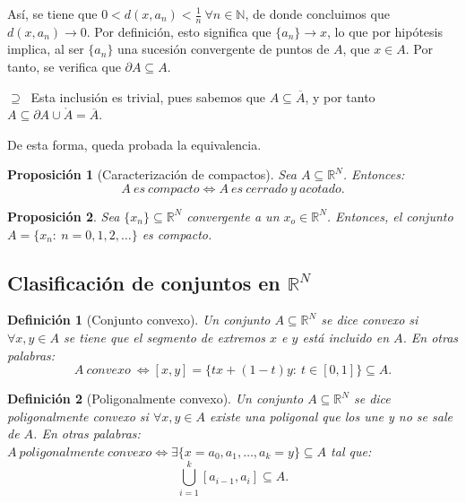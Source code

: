 \documentclass[11pt, a4paper, titlepage]{article}
\makeatletter
\renewenvironment{proof}[1][\proofname] {\vspace{-15pt}\par\pushQED{\qed}\normalfont\topsep6\p@\@plus6\p@\relax\trivlist\item[\hskip\labelsep\it#1\@addpunct{.}]\ignorespaces}{\popQED\endtrivlist\@endpefalse}
\theoremstyle{theorem-style}
\newtheorem*{nprop}{Proposición}
\theoremstyle{definition-style}
\newtheorem*{ndef}{Definición}
\theoremstyle{remark-style}
\theoremstyle{example-style}
\makeatother
\begin{document}
\begin{proof}
\begin{description}
Así, se tiene que $0 < d(x,a_n) < \frac{1}{n}\ \forall n\in \mathbb{N}$, de donde concluimos que $d(x,a_n) \rightarrow 0$. Por definición, esto significa que $\{a_n\} \rightarrow x$, lo que por hipótesis implica, al ser $\{a_n\}$ una sucesión convergente de puntos de $A$, que  $x\in A$. Por tanto, se verifica que $\partial A \subseteq A$.

\item $\displaystyle \boxed{\supseteq}\ $ Esta inclusión es trivial, pues sabemos que $A \subseteq \overline{A}$, y por tanto $A \subseteq \partial A \cup \mathring{A} = \overline{A}$.
\end{description}

De esta forma, queda probada la equivalencia.
\end{proof}



\begin{nprop}[Caracterización de compactos]
Sea $A \subseteq \mathbb{R}^N$. Entonces: $$A\ es\ compacto \iff A\ es\ cerrado\ y\ acotado.$$
\end{nprop}



\begin{nprop}
Sea $\{x_n\} \subseteq \mathbb{R}^N$ convergente a un $x_o \in \mathbb{R}^N$. Entonces, el conjunto \hfill \\$A = \{x_n:\ n=0,1,2,\dots \}$ es compacto.
\end{nprop}



\subsection{Clasificación de conjuntos en $\mathbb{R}^N$}

\begin{ndef}[Conjunto convexo]
Un conjunto $A\subseteq \mathbb{R}^N$ se dice \textit{convexo} si $\forall x,y \in A$ se tiene que el segmento de extremos $x$ e $y$ está incluido en $A$. En otras palabras: $$A\ convexo\ \iff [x,y] = \{tx + (1-t)y: \ t\in [0,1]\} \subseteq A.$$
\end{ndef}



\begin{ndef}[Poligonalmente convexo]
Un conjunto $A\subseteq \mathbb{R}^N$ se dice \textit{poligonalmente convexo} si  $\forall x,y \in A$ existe una poligonal que los une y no se sale de $A$. En otras palabras:  $A\ poligonalmente\ convexo \iff \exists \{x= a_0, a_1,\dots,a_k=y \}\subseteq A$ tal que: $$\bigcup_{i=1}^k [a_{i-1},a_i] \subseteq A.$$
\end{ndef}
\end{document}
